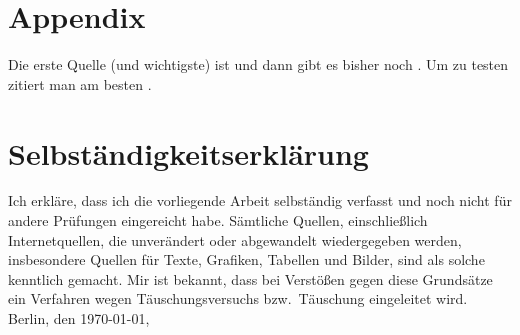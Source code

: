 \documentclass[draft=false,twoside,12pt]{scrreprt}
\begin{document}

\appendix
\chapter{Appendix}


Die erste Quelle (und wichtigste) ist \cite{Bar15} und dann gibt es bisher 
noch
\cite[200]{Roc70}.
Um zu testen zitiert man am besten \cite{Mus99}.

\printbibliography

\chapter*{Selbständigkeitserklärung}
Ich erkläre, dass ich die vorliegende Arbeit selbständig verfasst und noch nicht 
für andere Prüfungen eingereicht habe. Sämtliche Quellen, einschließlich
Internetquellen, die unverändert oder abgewandelt wiedergegeben werden,
insbesondere Quellen für Texte, Grafiken, Tabellen und Bilder, sind als solche
kenntlich gemacht. Mir ist bekannt, dass bei Verstößen gegen diese Grundsätze ein
Verfahren wegen Täuschungsversuchs bzw.\ Täuschung eingeleitet wird. 
\bigbreak
\noindent Berlin, den \today, 
\end{document}
